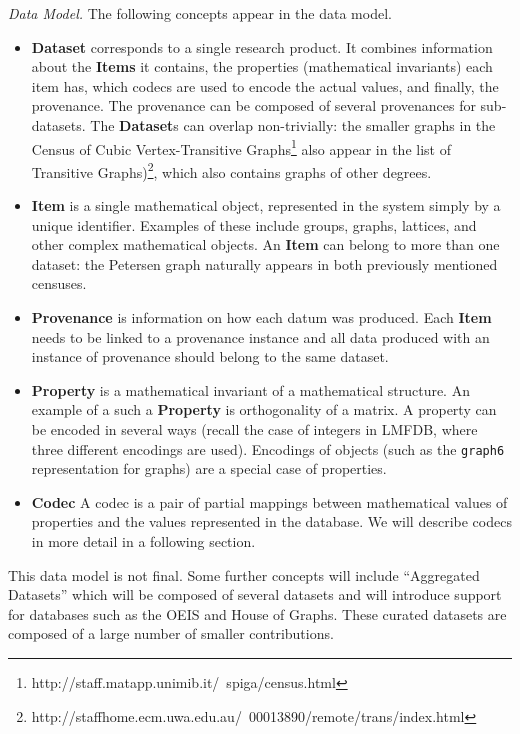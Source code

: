 \medskip

\emph{\dmh Data Model.} The following concepts appear in the data model.
\begin{itemize}

\item \textbf{Dataset} corresponds to a single research product.
It combines information about the \textbf{Items} it contains,
the properties (mathematical invariants) each item has,
which codecs are used to encode the actual values,
and finally, the provenance.
The provenance can be composed of several provenances for sub-datasets.
The \textbf{Dataset}s can overlap non-trivially: 
the smaller graphs in the Census of Cubic Vertex-Transitive Graphs\footnote{http://staff.matapp.unimib.it/~spiga/census.html}
also appear in the list of Transitive Graphs)\footnote{http://staffhome.ecm.uwa.edu.au/~00013890/remote/trans/index.html},
which also contains graphs of other degrees.

\item \textbf{Item} is a single mathematical object, 
represented in the system simply by a unique identifier.
Examples of these include groups, graphs, lattices, and other complex mathematical objects.
An \textbf{Item} can belong to more than one dataset:
the Petersen graph naturally appears in both previously mentioned censuses.

\item \textbf{Provenance} is information on how each datum was produced.
Each \textbf{Item} needs to be linked to a provenance instance and 
all data produced with an instance of provenance should belong to the same dataset.

\item \textbf{Property} is a mathematical invariant of a mathematical structure.
An example of a such a \textbf{Property} is orthogonality of a matrix.
A property can be encoded in several ways
(recall the case of integers in LMFDB, where three different encodings are used).
Encodings of objects (such as the \texttt{graph6} representation for graphs)
are a special case of properties.

\item \textbf{Codec} A codec is a pair of partial mappings between 
mathematical values of properties and the values represented in the database.
We will describe codecs in more detail in a following section.

\end{itemize}
This data model is not final.
Some further concepts will include ``Aggregated Datasets'' which will be composed of several datasets and will
introduce support for databases such as the OEIS and House of Graphs.
These curated datasets are composed of a large number of smaller contributions.

